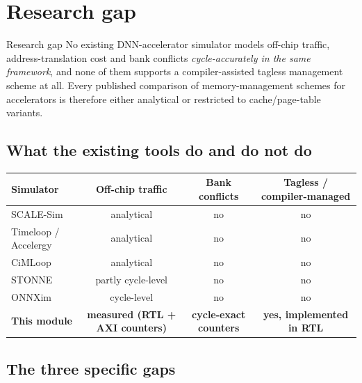 \documentclass[11pt,a4paper]{article}
\begin{document}
\section{Research gap}

\begin{keybox}{Research gap}
No existing DNN-accelerator simulator models off-chip traffic,
address-translation cost and bank conflicts \emph{cycle-accurately in the same
framework}, and none of them supports a compiler-assisted tagless management
scheme at all. Every published comparison of memory-management schemes for
accelerators is therefore either analytical or restricted to cache/page-table
variants.
\end{keybox}

\subsection{What the existing tools do and do not do}

\begin{center}
\small
\begin{tabular}{@{}lccc@{}}
\toprule
\textbf{Simulator} & \textbf{Off-chip traffic} & \textbf{Bank conflicts} &
\textbf{Tagless / compiler-managed} \\
\midrule
SCALE-Sim            & analytical    & no  & no \\
Timeloop / Accelergy & analytical    & no  & no \\
CiMLoop              & analytical    & no  & no \\
STONNE               & partly cycle-level & no  & no \\
ONNXim               & cycle-level   & no  & no \\
\midrule
\textbf{This module} & \textbf{measured (RTL + AXI counters)} &
\textbf{cycle-exact counters} & \textbf{yes, implemented in RTL} \\
\bottomrule
\end{tabular}
\end{center}

\subsection{The three specific gaps}
\end{document}
